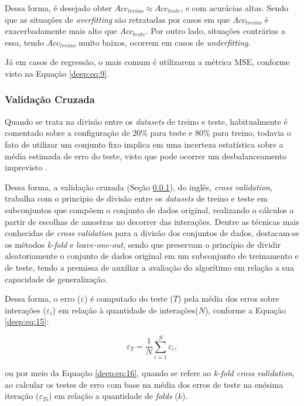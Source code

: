 Dessa forma, é desejado obter $Acc_{treino} \approx Acc_{teste}$, e com  acurácias altas. Sendo que as situações de \textit{overfitting} são retratadas por casos em que $Acc_{treino}$ é exacerbadamente mais alto que $Acc_{teste}$. Por outro lado, situações contrárias a essa, tendo $Acc_{treino}$ muito baixos, ocorrem em casos de \textit{underfitting}.

Já em casos de regressão, o mais comum é utilizarem a métrica MSE, conforme visto na Equação \ref{deep:eq:9}.


\subsubsection{Validação Cruzada}
\label{deep:cross}

Quando se trata na divisão entre os \textit{datasets} de treino e teste, habitualmente é comentado sobre a configuração de 20\% para teste e 80\% para treino, todavia o fato de utilizar um conjunto fixo implica em uma incerteza estatística sobre a média estimada de erro do teste, visto que pode ocorrer um desbalanceamento imprevisto \cite{Goodfellow2016}.

Dessa forma, a validação cruzada (Seção \ref{deep:cross}), do inglês, \textit{cross validation}, trabalha com o principio de divisão entre os \textit{datasets} de treino e teste em subconjuntos que compõem o conjunto de dados original, realizando o cálculos a partir de escolhas de amostras no decorrer das interações. Dentre as técnicas mais conhecidas de \textit{cross validation} para a divisão dos conjuntos de dados, destacam-se os métodos \textit{k-fold} e \textit{leave-one-out}, sendo que preservam o princípio de dividir aleatoriamente o conjunto de dados original em um subconjunto de treinamento e de teste, tendo a premissa de auxiliar a avaliação do algorítimo em relação a sua capacidade de generalização.

Dessa forma, o erro ($\varepsilon$) é computado do teste ($T$) pela média dos erros sobre interações ($\varepsilon_i$) em relação à quantidade de interações($N$), conforme a Equação \ref{deep:eq:15}:

\begin{equation}
    \label{deep:eq:15}
    \varepsilon_T = \frac{1}{N} \sum_{i=1}^{N} \varepsilon_i,
\end{equation}

ou por meio da Equação \ref{deep:eq:16}, quando se refere ao \textit{k-fold cross validation}, ao calcular os testes de erro com base na média dos erros de teste na enésima iteração ($\varepsilon_{Ti}$) em relação a quantidade de \textit{folds} ($k$).

